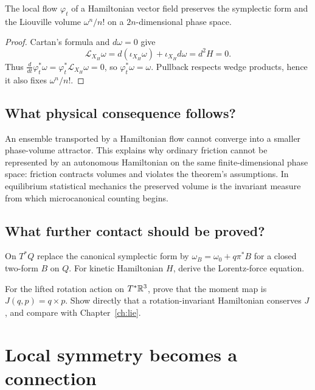 \begin{theorem}[Liouville]
The local flow $\varphi_t$ of a Hamiltonian vector field preserves the
symplectic form and the Liouville volume $\omega^n/n!$ on a $2n$-dimensional
phase space.
\end{theorem}

\begin{proof}
Cartan's formula and $d\omega=0$ give
\[
\mathcal L_{X_H}\omega
=d(\iota_{X_H}\omega)+\iota_{X_H}d\omega=d^2H=0.
\]
Thus
$\frac d{dt}\varphi_t^*\omega
=\varphi_t^*\mathcal L_{X_H}\omega=0$,
so $\varphi_t^*\omega=\omega$.  Pullback respects wedge products, hence it
also fixes $\omega^n/n!$.
\end{proof}

\section{What physical consequence follows?}

An ensemble transported by a Hamiltonian flow cannot converge into a smaller
phase-volume attractor.  This explains why ordinary friction cannot be
represented by an autonomous Hamiltonian on the same finite-dimensional
phase space: friction contracts volumes and violates the theorem's
assumptions.  In equilibrium statistical mechanics the preserved volume is
the invariant measure from which microcanonical counting begins.

\section{What further contact should be proved?}

\begin{exercise}
On $T^*Q$ replace the canonical symplectic form by
$\omega_B=\omega_0+q\pi^*B$ for a closed two-form $B$ on $Q$.  For kinetic
Hamiltonian $H$, derive the Lorentz-force equation.
\end{exercise}

\begin{exercise}
For the lifted rotation action on $T^*\mathbb R^3$, prove that the moment map is
$J(q,p)=q\times p$.  Show directly that a rotation-invariant Hamiltonian
conserves $J$, and compare with Chapter~\ref{ch:lie}.
\end{exercise}


\chapter{Local symmetry becomes a connection}
\label{ch:gauge}

